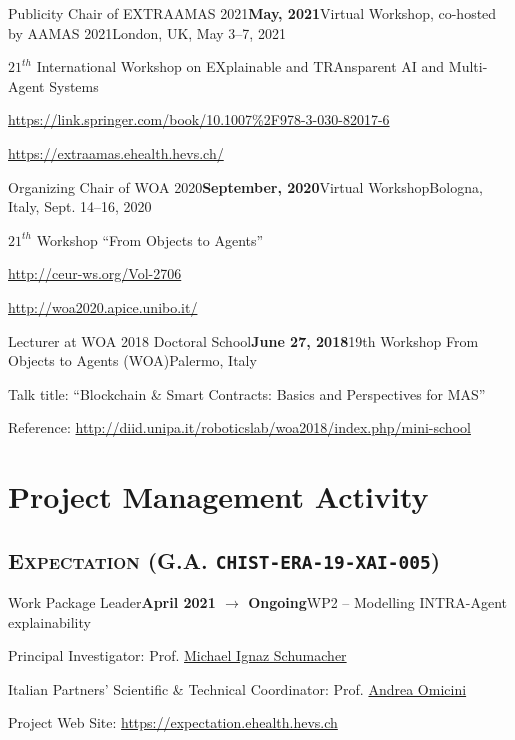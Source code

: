 \begin{activity}{Publicity Chair of EXTRAAMAS 2021}{\textbf{May, 2021}}{Virtual Workshop, co-hosted by AAMAS 2021}{London, UK, May 3--7, 2021}
    \item $21^{th}$ International Workshop on EXplainable and TRAnsparent AI and Multi-Agent Systems
    \item \url{https://link.springer.com/book/10.1007%2F978-3-030-82017-6}
    \item \url{https://extraamas.ehealth.hevs.ch/}
\end{activity}

\begin{activity}{Organizing Chair of WOA 2020}{\textbf{September, 2020}}{Virtual Workshop}{Bologna, Italy, Sept. 14--16, 2020}
    \item $21^{th}$ Workshop ``From Objects to Agents''
    \item \url{http://ceur-ws.org/Vol-2706}
    \item \url{http://woa2020.apice.unibo.it/}
\end{activity}

\begin{activity}{Lecturer at WOA 2018 Doctoral School}{\textbf{June 27, 2018}}{19th Workshop From Objects to Agents (WOA)}{Palermo, Italy}
    \item Talk title: ``Blockchain \& Smart Contracts: Basics and Perspectives for MAS''
    \item Reference: \url{http://diid.unipa.it/roboticslab/woa2018/index.php/mini-school}
\end{activity}

\section*{Project Management Activity}

\subsection*{\textsc{Expectation} (G.A. \texttt{CHIST-ERA-19-XAI-005})}

\begin{activity}{Work Package Leader}{\textbf{April 2021 $\rightarrow$ Ongoing}}{WP2 -- Modelling INTRA-Agent explainability}{}
    \item Principal Investigator: Prof. \href{mailto:michael.schumacher@hevs.ch}{Michael Ignaz Schumacher}
    \item Italian Partners' Scientific \& Technical Coordinator: Prof. \href{mailto:andrea.omicini@unibo.it}{Andrea Omicini}
    \item Project Web Site: \url{https://expectation.ehealth.hevs.ch}
\end{activity}

